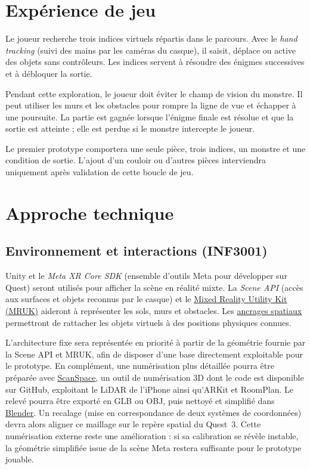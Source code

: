 \documentclass[11pt,a4paper]{article}
\newcommand{\doclink}[2]{\href{#1}{\textcolor{linkBlue}{\underline{#2}}}}
\begin{document}
\section{Expérience de jeu}

Le joueur recherche trois indices virtuels répartis dans le parcours. Avec le \emph{hand tracking} (suivi des mains par les caméras du casque), il saisit, déplace ou active des objets sans contrôleurs. Les indices servent à résoudre des énigmes successives et à débloquer la sortie.

Pendant cette exploration, le joueur doit éviter le champ de vision du monstre. Il peut utiliser les murs et les obstacles pour rompre la ligne de vue et échapper à une poursuite. La partie est gagnée lorsque l'énigme finale est résolue et que la sortie est atteinte ; elle est perdue si le monstre intercepte le joueur.

Le premier prototype comportera une seule pièce, trois indices, un monstre et une condition de sortie. L'ajout d'un couloir ou d'autres pièces interviendra uniquement après validation de cette boucle de jeu.

\clearpage
\section{Approche technique}

\subsection{Environnement et interactions (INF3001)}

Unity et le \emph{Meta XR Core SDK} (ensemble d'outils Meta pour développer sur Quest) seront utilisés pour afficher la scène en réalité mixte. La \emph{Scene API} (accès aux surfaces et objets reconnus par le casque) et le \doclink{https://developers.meta.com/vr/documentation/unity/unity-mr-utility-kit-samples/}{Mixed Reality Utility Kit (MRUK)} aideront à représenter les sols, murs et obstacles. Les \doclink{https://developers.meta.com/vr/documentation/unity/unity-spatial-anchors-persist-content/}{ancrages spatiaux} permettront de rattacher les objets virtuels à des positions physiques connues.

L'architecture fixe sera représentée en priorité à partir de la géométrie fournie par la Scene API et MRUK, afin de disposer d'une base directement exploitable pour le prototype. En complément, une numérisation plus détaillée pourra être préparée avec \doclink{https://github.com/aabdlwahab/3d-scanner}{ScanSpace}, un outil de numérisation 3D dont le code est disponible sur GitHub, exploitant le LiDAR de l'iPhone ainsi qu'ARKit et RoomPlan. Le relevé pourra être exporté en GLB ou OBJ, puis nettoyé et simplifié dans \doclink{https://www.blender.org/}{Blender}. Un recalage (mise en correspondance de deux systèmes de coordonnées) devra alors aligner ce maillage sur le repère spatial du Quest~3. Cette numérisation externe reste une amélioration : si sa calibration se révèle instable, la géométrie simplifiée issue de la scène Meta restera suffisante pour le prototype jouable.
\end{document}
